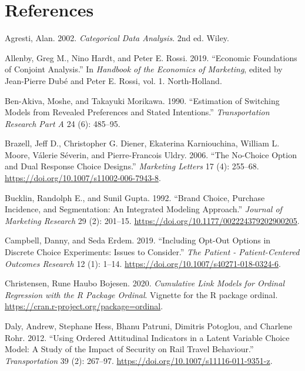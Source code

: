 \documentclass[
  letterpaper,
  DIV=11,
  numbers=noendperiod]{scrartcl}
\newlength{\cslhangindent}
\newenvironment{CSLReferences}[2] %
 {\begin{list}{}{%
  \setlength{\itemindent}{0pt}
  \setlength{\leftmargin}{0pt}
  \setlength{\parsep}{0pt}
  \ifodd #1
   \setlength{\leftmargin}{\cslhangindent}
   \setlength{\itemindent}{-1\cslhangindent}
  \fi
  \setlength{\itemsep}{#2\baselineskip}}}
 {\end{list}}
\theoremstyle{plain}
\theoremstyle{plain}
\theoremstyle{plain}
\theoremstyle{remark}
\begin{document}
\section*{References}\label{references}

\protect{}\label{refs}
\begin{CSLReferences}{1}{1}
Agresti, Alan. 2002. \emph{Categorical Data Analysis}. 2nd ed. Wiley.

Allenby, Greg M., Nino Hardt, and Peter E. Rossi. 2019. {``Economic
Foundations of Conjoint Analysis.''} In \emph{Handbook of the Economics
of Marketing}, edited by Jean-Pierre Dubé and Peter E. Rossi, vol. 1.
North-Holland.

Ben-Akiva, Moshe, and Takayuki Morikawa. 1990. {``Estimation of
Switching Models from Revealed Preferences and Stated Intentions.''}
\emph{Transportation Research Part A} 24 (6): 485--95.

Brazell, Jeff D., Christopher G. Diener, Ekaterina Karniouchina, William
L. Moore, Válerie Séverin, and Pierre-Francois Uldry. 2006. {``The
No-Choice Option and Dual Response Choice Designs.''} \emph{Marketing
Letters} 17 (4): 255--68.
\url{https://doi.org/10.1007/s11002-006-7943-8}.

Bucklin, Randolph E., and Sunil Gupta. 1992. {``Brand Choice, Purchase
Incidence, and Segmentation: An Integrated Modeling Approach.''}
\emph{Journal of Marketing Research} 29 (2): 201--15.
\url{https://doi.org/10.1177/002224379202900205}.

Campbell, Danny, and Seda Erdem. 2019. {``Including Opt-Out Options in
Discrete Choice Experiments: Issues to Consider.''} \emph{The Patient -
Patient-Centered Outcomes Research} 12 (1): 1--14.
\url{https://doi.org/10.1007/s40271-018-0324-6}.

Christensen, Rune Haubo Bojesen. 2020. \emph{Cumulative Link Models for
Ordinal Regression with the {R} Package Ordinal}. Vignette for the R
package ordinal. \url{https://cran.r-project.org/package=ordinal}.

Daly, Andrew, Stephane Hess, Bhanu Patruni, Dimitris Potoglou, and
Charlene Rohr. 2012. {``Using Ordered Attitudinal Indicators in a Latent
Variable Choice Model: A Study of the Impact of Security on Rail Travel
Behaviour.''} \emph{Transportation} 39 (2): 267--97.
\url{https://doi.org/10.1007/s11116-011-9351-z}.


\end{CSLReferences}
\end{document}
